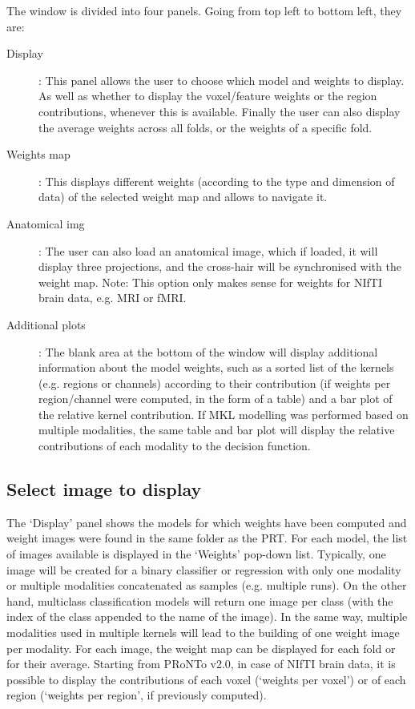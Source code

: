 \noindent The window is divided into four panels. Going from top left to bottom left, they are:
\\

\begin{description}
\item[Display]: This panel allows the user to choose which model and weights to display. As well as whether to display the voxel/feature weights or the region contributions, whenever this is available. Finally the user can also display the average weights across all folds, or the weights of a specific fold.

\item[Weights map]: This displays different weights (according to the type and dimension of data) of the selected weight map and allows to navigate it.

\item[Anatomical img]: The user can also load an anatomical image, which if loaded, it will display three projections, and the cross-hair will be synchronised with the weight map. Note: This option only makes sense for weights for NIfTI brain data, e.g. MRI or fMRI.

\item[Additional plots]: The blank area at the bottom of the window will display additional information about the model weights, such as a sorted list of the kernels (e.g. regions or channels) according to their contribution (if weights per region/channel were computed, in the form of a table) and a bar plot of the relative kernel contribution. If MKL modelling was performed based on multiple modalities, the same table and bar plot will display the relative contributions of each modality to the decision function. 
\end{description}

\subsection{Select image to display}

The `Display' panel shows the models for which weights have been computed and weight images were found in the same folder as the PRT. For each model, the list of images available is displayed in the `Weights' pop-down list. Typically, one image will be created for a binary classifier or regression with only one modality or multiple modalities concatenated as samples (e.g. multiple runs). On the other hand, multiclass classification models will return one image per class (with the index of the class appended to the name of the image). In the same way, multiple modalities used in multiple kernels will lead to the building of one weight image per modality. For each image, the weight map can be displayed for each fold or for their average. Starting from PRoNTo v2.0, in case of NIfTI brain data, it is possible to display the contributions of each voxel (`weights per voxel') or of each region (`weights per region', if previously computed).
\\

